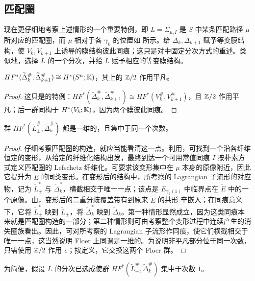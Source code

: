 \clearpage
\subsection{匹配圈}\label{sec:18h}
现在更仔细地考察上述情形的一个重要特例，即 $L=\Sigma_{\mu,I}$ 是 $S$ 中某条匹配路径 $\mu$ 所对应的匹配圈，而 $\mu$ 相对于各 $\gamma_k$ 的位置如 所示。给 $\widetilde\Delta_k,\widetilde\Delta_{k+1}$ 赋予等变膜结构，使 $V_k,V_{k+1}$ 上诱导的膜结构彼此同痕；这只是对中固定分次方式的重述。类似地，选择 $L$ 的一个分次，并给 $\widetilde L$ 赋予相应的等变膜结构。

\begin{lemma}\label{st:18.18}
$HF^*(\widetilde\Delta_k^\#,\widetilde\Delta_{k+1}^\#)\cong H^*(S^n;\mathbb K)$，其上的 $\mathbb Z/2$ 作用平凡。
\end{lemma}
\begin{proof}
这只是的特例：$HF^*(\widetilde\Delta_k^\#,\widetilde\Delta_{k+1}^\#)\cong HF^*(V_k^\#,V_{k+1}^\#)$，且 $\mathbb Z/2$ 作用平凡；后一群同构于 $H^*(V_k;\mathbb K)$，因为两个膜彼此同痕。
\end{proof}

\begin{lemma}\label{st:18.19}
群 $HF^*(\widetilde L_\pm^\#,\widetilde\Delta_k^\#)$ 都是一维的，且集中于同一个次数。
\end{lemma}
\begin{proof}
仔细考察匹配圈的构造，就应当能看清这一点。利用，可找到一个沿各纤维恒定的变形，从给定的纤维化结构出发，最终到达一个可用常值同痕 $I$ 按朴素方式定义匹配圈的 Lefschetz 纤维化。可要求该变形集中在 $\mu$ 本身的原像附近，因此它提升为 $\widetilde E$ 的同类变形。在变形后的结构中，所考察的 Lagrangian 子流形的对应物，记为 $\widetilde L_\pm^*$ 与 $\widetilde\Delta_k^*$，横截相交于唯一一点；该点是 $E_{\gamma_k(1)}$ 中临界点在 $\widetilde E$ 中的一个原像。由，变形后的二重分歧覆盖带有到原来 $\widetilde E$ 的共形
辛嵌入；在同痕意义下，它将 $\widetilde L_\pm^*$ 映到 $\widetilde L_\pm$，将 $\widetilde\Delta_k^*$ 映到 $\widetilde\Delta_k$。第一种情形显然成立，因为这类同痕本来就是匹配圈构造的一部分；第二种情形则可由考察整个变形过程中连续产生的消失圈族看出。因此，可对所考察的 Lagrangian 子流形作同痕，使它们横截相交于唯一一点，这当然说明 Floer 上同调是一维的。为说明非平凡部分位于同一次数，只需使用 $\mathbb Z/2$ 作用 $\epsilon$；按定义，它交换这两个 Floer 群。
\end{proof}

为简便，假设 $L$ 的分次已选成使群 $HF^*(\widetilde L_\pm^\#,\widetilde\Delta_k^\#)$ 集中于次数 $1$。

